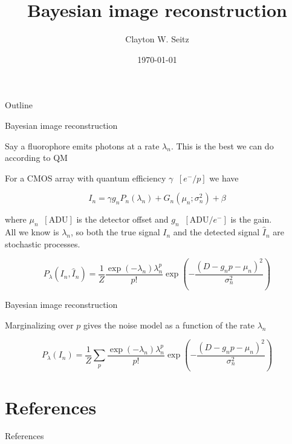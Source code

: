 \documentclass{beamer}					%
\title{Bayesian image reconstruction}	%
\author{Clayton W. Seitz}								%
\date{\today}									%
\begin{document}
\begin{frame}
  \titlepage
\end{frame}

\begin{frame}{Outline}
  \tableofcontents
\end{frame}

%


\begin{frame}{Bayesian image reconstruction}

Say a fluorophore emits photons at a rate $\lambda_{n}$. This is the best we can do according to QM
\vspace{0.1in}

For a CMOS array with quantum efficiency $\gamma\;\;[e^{-}/p]$ we have

\begin{equation*}
I_{n} = \gamma g_{n}P_{n}(\lambda_{n}) + G_{n}(\mu_{n};\sigma_{n}^{2}) + \beta
\end{equation*}

where $\mu_{n} \;\;[\mathrm{ADU}]$ is the detector offset and $g_{n}\;\; [\mathrm{ADU}/e^{-}]$ is the gain. \\
\vspace{0.2in}
All we know is $\lambda_{n}$, so both the true signal $I_{n}$ and the detected signal $\hat{I}_{n}$ are stochastic processes. 

\begin{equation*}
P_{\lambda}(I_{n},\hat{I}_{n}) = \frac{1}{Z}\frac{\exp\left({-\lambda_{n}}\right)\lambda_{n}^{p}}{p!}\exp\left(-\frac{(D-g_{n}p-\mu_{n})^{2}}{\sigma_{n}^{2}}\right)
\end{equation*}

\end{frame}


\begin{frame}{Bayesian image reconstruction}

Marginalizing over $p$ gives the noise model as a function of the rate $\lambda_{n}$

\begin{equation*}
P_{\lambda}(I_{n}) = \frac{1}{Z}\sum_{p}\frac{\exp\left({-\lambda_{n}}\right)\lambda_{n}^{p}}{p!}\exp\left(-\frac{(D-g_{n}p-\mu_{n})^{2}}{\sigma_{n}^{2}}\right)
\end{equation*}



\end{frame}


\section{References}

\begin{frame}[allowframebreaks]{References}
	\tiny
	
\end{frame}
\end{document}
